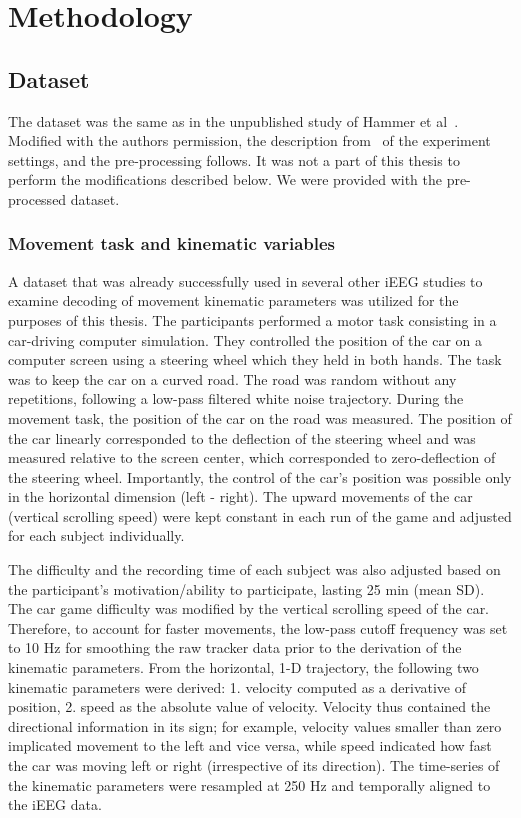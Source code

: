 \chapter{Methodology}\label{ch:methodology}


\section{Dataset}\label{sec:dataset}
The dataset was the same as in the unpublished study of Hammer et al~\cite{Hammer-2021}.
Modified with the authors permission, the description from~\cite{hammer-predominance-2016} of the experiment settings,
and the pre-processing follows.
It was not a part of this thesis to perform the modifications described below.
We were provided with the pre-processed dataset.

\subsection{Movement task and kinematic variables}\label{subsec:movement-task-and-kinematic-variables}
A dataset that was already successfully used in several other iEEG studies to examine decoding of movement kinematic parameters\cite{Hammer-2021,hammer-predominance-2016,hammer-role-2013} was utilized for the purposes of this thesis.
The participants performed a motor task consisting in a car-driving computer simulation.
They controlled the position of the car on a computer screen using a steering wheel which they held in both hands.
The task was to keep the car on a curved road.
The road was random without any repetitions, following a low-pass filtered white noise trajectory.
During the movement task, the position of the car on the road was measured.
The position of the car linearly corresponded to the deflection of the steering wheel and was measured relative to the screen center, which corresponded to zero-deflection of the steering wheel.
Importantly, the control of the car's position was possible only in the horizontal dimension (left - right).
The upward movements of the car (vertical scrolling speed) were kept constant in each run of the game and adjusted for each subject individually.

The difficulty and the recording time of each subject was also adjusted based on the participant's motivation/ability to participate, lasting 25  min (mean \pm SD).
The car game difficulty was modified by the vertical scrolling speed of the car.
Therefore, to account for faster movements, the low-pass cutoff frequency was set to 10 Hz for smoothing the raw tracker data prior to the derivation of the kinematic parameters.
From the horizontal, 1-D trajectory, the following two kinematic parameters were derived:
1. velocity computed as a derivative of position, 2. speed as the absolute value of velocity.
Velocity thus contained the directional information in its sign;
for example, velocity values smaller than zero implicated movement to the left and vice versa, while speed indicated how fast the car was moving left or right (irrespective of its direction).
The time-series of the kinematic parameters were resampled at 250 Hz and temporally aligned to the iEEG data.

